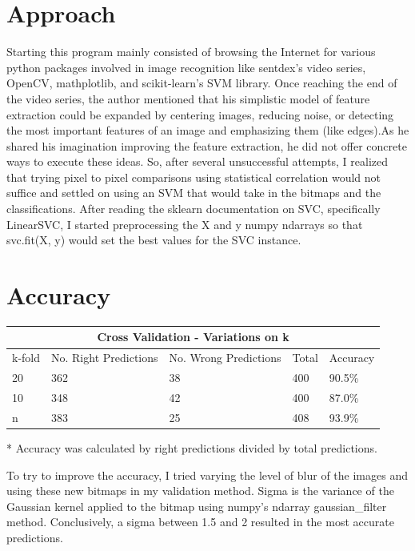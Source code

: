 \documentclass{article}
\begin{document}
\section{Approach}

Starting this program mainly consisted of browsing the Internet for various python packages involved in image recognition like sentdex's video series, OpenCV, mathplotlib, and scikit-learn's SVM library. Once reaching the end of the video series, the author mentioned that his simplistic model of feature extraction could be expanded by centering images, reducing noise, or detecting the most important features of an image and emphasizing them (like edges).As he shared his imagination improving the feature extraction, he did not offer concrete ways to execute these ideas. So, after several unsuccessful attempts, I realized that trying pixel to pixel comparisons using statistical correlation would not suffice and settled on using an SVM that would take in the bitmaps and the classifications. After reading the sklearn documentation on SVC, specifically LinearSVC, I started preprocessing the X and y numpy ndarrays so that svc.fit(X, y) would set the best values for the SVC instance. 

\section{Accuracy}

\begin{center}
\begin{tabular}{ |p{2cm}||p{2cm}|p{2cm}|p{2cm}|p{2cm}|  }
 \hline
 \multicolumn{5}{|c|}{Cross Validation - Variations on k} \\
 \hline
 k-fold & No. Right Predictions & No. Wrong Predictions & Total & Accuracy \\
 \hline
 20 & 362 & 38 & 400 & 90.5\% \\
 10 & 348 & 42 & 400 & 87.0\% \\
 n & 383 & 25 & 408 & 93.9\% \\
 \hline
\end{tabular}
\end{center}

* Accuracy was calculated by right predictions divided by total predictions. 

\leavevmode\newline

To try to improve the accuracy, I tried varying the level of blur of the images and using these new bitmaps in my validation method. Sigma is the variance of the Gaussian kernel applied to the bitmap using numpy's ndarray gaussian\_filter method. Conclusively, a sigma between 1.5 and 2 resulted in the most accurate predictions. 
\end{document}
